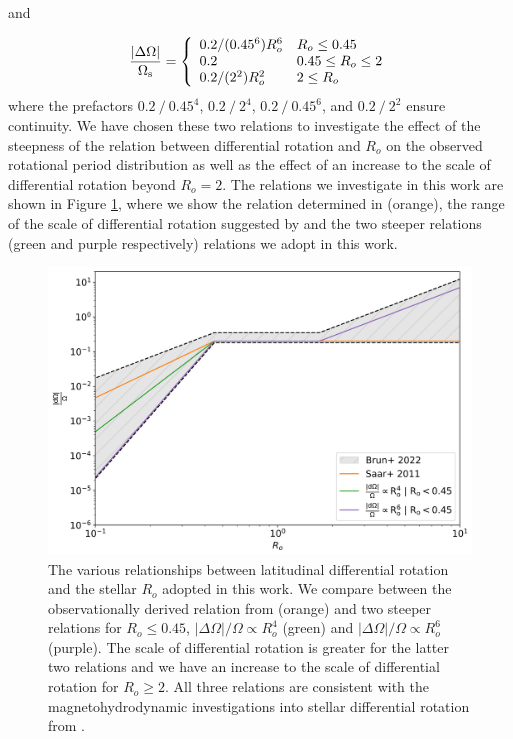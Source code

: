 and

\begin{equation}
{\centering
\frac{|\Delta\Omega|}{\Omega_{\rm{s}}} =  \left\{
\begin{array}{ll}
   0.2/(0.45^6) R_o^6& R_o\leq 0.45 \\
   0.2 & 0.45\leq R_o\leq 2 \\
   0.2/(2^2) R_o^2 & 2\leq R_o \\
\end{array} 
\right.}
\end{equation}
where the prefactors $0.2 \ / \ 0.45^{4}$, $0.2 \ / \ 2^{4}$, $0.2 \ / \ 0.45^{6}$, and $0.2 \ / \ 2^{2}$ ensure continuity.
We have chosen these two relations to investigate the effect of the steepness of the relation between differential rotation and $R_o$ on the observed rotational period distribution as well as the effect of an increase to the scale of differential rotation beyond $R_o = 2$.
The relations we investigate in this work are shown in Figure \ref{fig:compar_diffrot}, where we show the relation determined in \citet{saar_starspots_2011} (orange), the range of the scale of differential rotation suggested by \citet{brun_powering_2022} and the two steeper relations (green and purple respectively) relations we adopt in this work.

\begin{figure}
\centering
  \includegraphics[width=\textwidth]{Figures/rot_gap_figures/comparison_diffrot.png}
  \caption[The various relationships between latitudinal differential rotation and the stellar $R_o$ adopted in this work.]{
  	The various relationships between latitudinal differential rotation and the stellar $R_o$ adopted in this work. We compare between the observationally derived relation from \citet{saar_starspots_2011} (orange) and two steeper relations for $R_o\leq0.45$, $|\Delta \Omega|/\Omega \propto R_o^4$ (green) and $|\Delta \Omega|/\Omega \propto R_o^6$ (purple). The scale of differential rotation is greater for the latter two relations and we have an increase to the scale of differential rotation for $R_o\geq2$. All three relations are consistent with the magnetohydrodynamic investigations into stellar differential rotation from \citet{brun_powering_2022}.
}
  \label{fig:compar_diffrot}
\end{figure}

